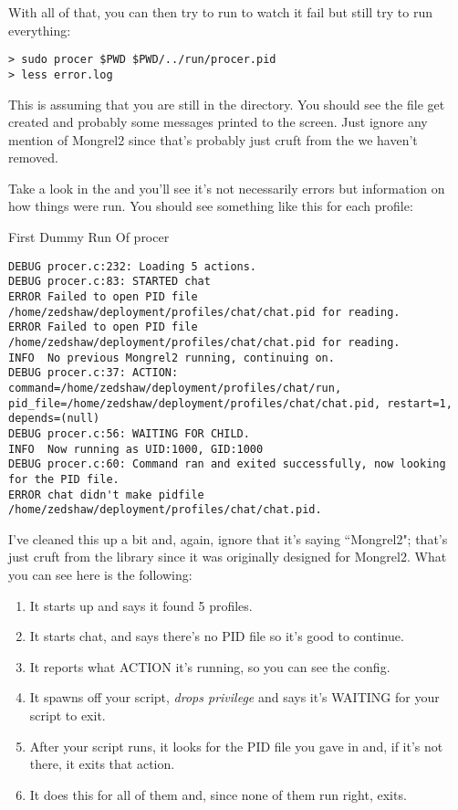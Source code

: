 With all of that, you can then try to run  to watch
it fail but still try to run everything:

\begin{Verbatim}
> sudo procer $PWD $PWD/../run/procer.pid
> less error.log
\end{Verbatim}

This is assuming that you are still in the  directory.
You should see the file  get created and
probably some messages printed to the screen.  Just ignore any
mention of Mongrel2 since that's probably just cruft from the 
we haven't removed.

Take a look in the  and you'll see it's not necessarily
errors but information on how things were run.  You should
see something like this for each profile:

\begin{code}{First Dummy Run Of procer}
\begin{Verbatim}
DEBUG procer.c:232: Loading 5 actions.
DEBUG procer.c:83: STARTED chat
ERROR Failed to open PID file /home/zedshaw/deployment/profiles/chat/chat.pid for reading.
ERROR Failed to open PID file /home/zedshaw/deployment/profiles/chat/chat.pid for reading.
INFO  No previous Mongrel2 running, continuing on.
DEBUG procer.c:37: ACTION: command=/home/zedshaw/deployment/profiles/chat/run, pid_file=/home/zedshaw/deployment/profiles/chat/chat.pid, restart=1, depends=(null)
DEBUG procer.c:56: WAITING FOR CHILD.
INFO  Now running as UID:1000, GID:1000
DEBUG procer.c:60: Command ran and exited successfully, now looking for the PID file.
ERROR chat didn't make pidfile /home/zedshaw/deployment/profiles/chat/chat.pid.
\end{Verbatim}
\end{code}

I've cleaned this up a bit and, again, ignore that it's saying ``Mongrel2";
that's just cruft from the library since it was originally designed
for Mongrel2.  What you can see here is the following:

\begin{enumerate}
\item It starts up and says it found 5 profiles.
\item It starts chat, and says there's no PID file so it's good to continue.
\item It reports what ACTION it's running, so you can see the config.
\item It spawns off your  script, \emph{drops privilege}
     and says it's WAITING for your script to exit.
\item After your script runs, it looks for the PID file you gave in  and, if it's not there, it exits that action.
\item It does this for all of them and, since none of them run right,  exits.
\end{enumerate}

